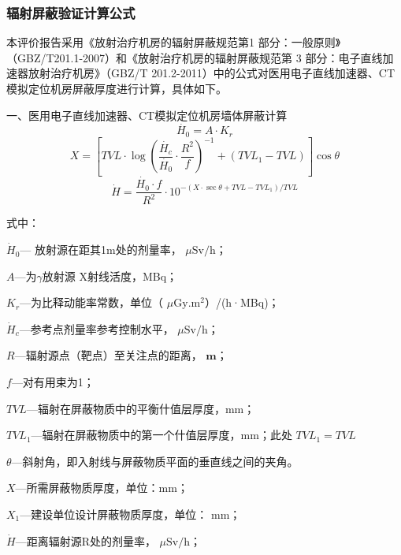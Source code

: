


\subsubsection{辐射屏蔽验证计算公式}

本评价报告采用《放射治疗机房的辐射屏蔽规范第1 部分：一般原则》（GBZ/T201.1-2007）和《放射治疗机房的辐射屏蔽规范第 3 部分：电子直线加速器放射治疗机房》（GBZ/T 201.2-2011）中的公式对医用电子直线加速器、CT模拟定位机房屏蔽厚度进行计算，具体如下。

一、医用电子直线加速器、CT模拟定位机房墙体屏蔽计算
\begin{equation}
    \dot{H_0}=A\cdot K_r
\end{equation}
\begin{equation}
    X=\left[TVL\cdot \log\left(\dfrac{\dot{H_c}}{\dot{H_0}}\cdot \dfrac{R^2}{f}\right)^{-1}+(TVL_1-TVL)\right]\cos\theta
\end{equation}
\begin{equation}
    \dot{H}=\dfrac{\dot{H_0}\cdot f}{R^2}\cdot 10^{-(X\cdot \sec\theta+TVL-TVL_1)/TVL}
\end{equation}

式中：

$\dot { H } _ {0}$— 放射源在距其1m处的剂量率， $\mu \mathrm { S v / h }$；

$A$—为$\gamma$放射源 X射线活度，MBq；

$K _ { r }$—为比释动能率常数，单位（ $\mu \mathrm { G y } . \mathrm { m } ^ { 2 }$）/(h·MBq)；

$\dot { H } _ { c }$—参考点剂量率参考控制水平， $\mu \mathrm { S v / h }$；

$R$—辐射源点（靶点）至关注点的距离， $\mathbf { m }$；

$f$—对有用束为1；

$TVL$—辐射在屏蔽物质中的平衡什值层厚度，mm；

$TVL_1$—辐射在屏蔽物质中的第一个什值层厚度，mm；此处 $T V L _ {1}  = T V L$

$\theta$—斜射角，即入射线与屏蔽物质平面的垂直线之间的夹角。

$X$—所需屏蔽物质厚度，单位：mm；

$X _ { 1 }$—建设单位设计屏蔽物质厚度，单位： $\mathrm { m m }$；

$\dot { H }$—距离辐射源R处的剂量率， $\mu \mathrm { S v / h }$；


